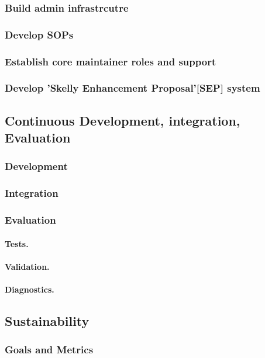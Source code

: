 \documentclass[11pt]{article}
\begin{document}
\subsubsection{Build admin infrastrcutre}
\subsubsection{Develop SOPs}
\subsubsection{Establish core maintainer roles and support}
\subsubsection{Develop 'Skelly Enhancement Proposal'[SEP] system}

\subsection{Continuous Development, integration, Evaluation}
\subsubsection{Development}
\subsubsection{Integration}
\subsubsection{Evaluation}
\paragraph{Tests.}
\paragraph{Validation.}
\paragraph{Diagnostics.}

\subsection{Sustainability}
\subsubsection{Goals and Metrics}
\end{document}
